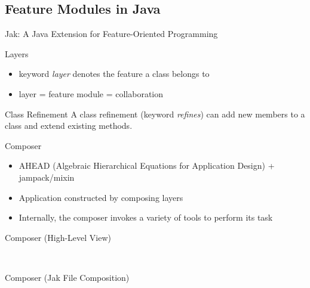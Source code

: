 \subsection{Feature Modules in Java}

\begin{frame}{Jak: A Java Extension for Feature-Oriented Programming } %
	\begin{fancycolumns}[animation=none]
		\begin{definition}{Layers}
			\begin{itemize}
				\item keyword \emph{layer} denotes the feature a class belongs to
				\item layer = feature module = collaboration %
			\end{itemize}
		\end{definition}
		\begin{definition}{Class Refinement}
			A class refinement (keyword \emph{refines}) can add new members to a class and extend existing methods. 
		\end{definition}
		\begin{definition}{Composer}
			\begin{itemize}
				\item AHEAD (Algebraic Hierarchical Equations for Application Design) + jampack/mixin
				\item Application constructed by composing layers
				\item Internally, the composer invokes a variety of tools to perform its task
			\end{itemize}
		\end{definition}
	\nextcolumn
		\begin{exampletight}{Composer (High-Level View)}
			\centering
		\end{exampletight}
		
		~
		
		\begin{exampletight}{Composer (Jak File Composition)}
			\centering
		\end{exampletight}
	\end{fancycolumns}
\end{frame}

